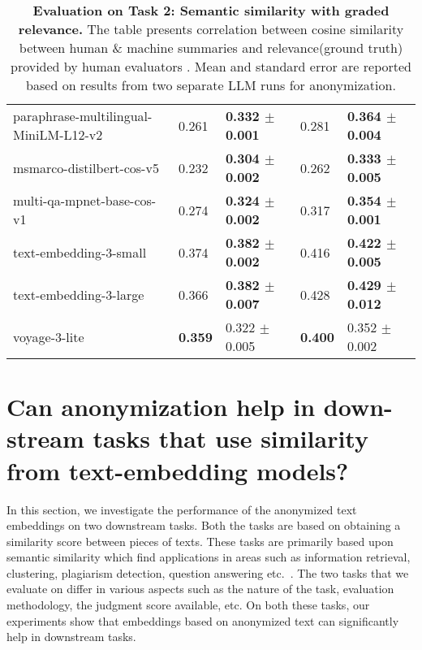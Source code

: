 \begin{table*}[ht!]
{\begin{tabular}{lll|ll}
paraphrase-multilingual-MiniLM-L12-v2 &                              0.261 &                 \textbf{0.332  $\pm$ 0.001} &                              0.281 &               \textbf{0.364  $\pm$ 0.004} \\
            msmarco-distilbert-cos-v5 &                              0.232 &                \textbf{0.304  $\pm$ 0.002} &                              0.262 &                \textbf{0.333  $\pm$ 0.005} \\
           multi-qa-mpnet-base-cos-v1 &                              0.274 &                 \textbf{0.324  $\pm$ 0.002 }&                              0.317 &                \textbf{0.354  $\pm$ 0.001} \\
               text-embedding-3-small &                              0.374 &                 \textbf{0.382  $\pm$ 0.002} &                              0.416 &                \textbf{0.422  $\pm$ 0.005} \\
               text-embedding-3-large &                              0.366 &                 \textbf{0.382  $\pm$ 0.007} &                              0.428 &                \textbf{0.429  $\pm$ 0.012} \\
                        voyage-3-lite &                             \textbf{0.359} &                 0.322  $\pm$ 0.005 &                              \textbf{0.400 } &                0.352  $\pm$ 0.002 \\


                        
\bottomrule
\end{tabular}


}
\caption{\textbf{Evaluation on Task 2: Semantic similarity with graded relevance.} The table presents correlation between cosine similarity  between human \& machine summaries and relevance(ground truth) provided by human evaluators \label{tab:eval_machine_summary_downstream}.  Mean and standard error are reported based on results from two separate LLM runs for anonymization.}
\end{table*}


\section{Can anonymization help in down-stream tasks that use similarity from text-embedding models?}
In this section, we investigate the performance of the anonymized text embeddings on two downstream tasks.  Both the tasks are based on obtaining a similarity score between pieces of texts. These tasks are primarily based upon semantic similarity which find applications in areas such as information retrieval, clustering, plagiarism detection, question answering etc.~\citep{reimers2019sentence}. The two tasks that we evaluate on differ in various aspects such as the nature of the task, evaluation methodology, the judgment score available, etc. 
On both these tasks, our experiments show that embeddings based on anonymized text can significantly help in downstream tasks.


